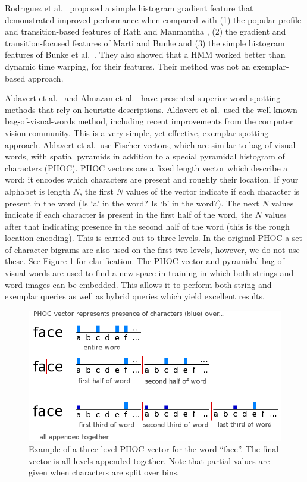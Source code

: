 \documentclass[ms,electronic,twosidetoc,letterpaper,chaptercenter,parttop,lof,lot]{byumsphd}
\begin{document}
Rodr{\i}guez et al.~\cite{Rodrıguez2008} proposed a simple histogram gradient feature that demonstrated improved performance when compared with (1) the popular profile and transition-based features of Rath and Manmantha \cite{Rath2003}, (2) the gradient and transition-focused features of Marti and Bunke \cite{Marti2001} and (3) the simple histogram features of Bunke et al.~\cite{Bunke2004}. They also showed that a HMM worked better than dynamic time warping, for their features. Their method was not an exemplar-based approach.

Aldavert et al.~\cite{Aldavert2015} and Almazan et al.~\cite{Almazan2014} have presented superior word spotting methods that rely on heuristic descriptions. Aldavert et al.~used the well known bag-of-visual-words method, including recent improvements from the computer vision community. This is a very simple, yet effective, exemplar spotting approach. Aldavert et al.~use Fischer vectors, which are similar to bag-of-visual-words, with spatial pyramids in addition to a special pyramidal histogram of characters (PHOC).
PHOC vectors are a fixed length vector which describe a word; it encodes which characters are present and roughly their location. If your alphabet is length $N$, the first $N$ values of the vector indicate if each character is present in the word (Is `a' in the word? Is `b' in the word?). The next $N$ values indicate if each character is present in the first half of the word, the $N$ values after that indicating presence in the second half of the word (this is the rough location encoding). This is carried out to three levels. In the original PHOC a set of character bigrams are also used on the first two levels, however, we do not use these. See Figure \ref{fig:phoc} for clarification.
The PHOC vector and pyramidal bag-of-visual-words are used to find a new space in training in which both strings and word images can be embedded. This allows it to perform both string and exemplar queries as well as hybrid queries which yield excellent results.

\begin{figure}[t]
    \centering
    \includegraphics[width=.65\textwidth]{phoc}
    \caption{Example of a three-level PHOC vector for the word ``face''. The final vector is all levels appended together. Note that partial values are given when characters are split over bins.}
    \label{fig:phoc}
\end{figure}
\end{document}
